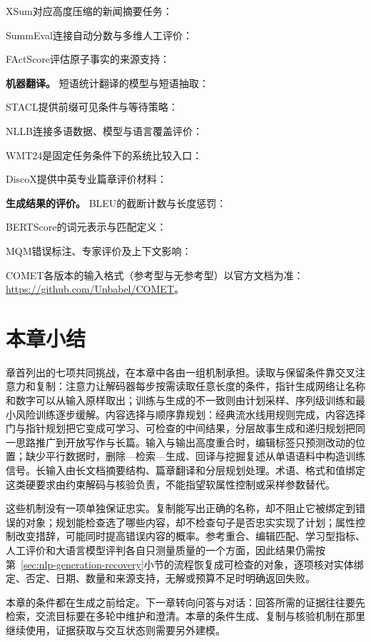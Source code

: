 \begin{fullwidth}
\par\smallskip
XSum对应高度压缩的新闻摘要任务：
\par\smallskip
SummEval连接自动分数与多维人工评价：
\par\smallskip
FActScore评估原子事实的来源支持：
\par\medskip
\textbf{机器翻译。}
短语统计翻译的模型与短语抽取：
\par\smallskip
STACL提供前缀可见条件与等待策略：
\par\smallskip
NLLB连接多语数据、模型与语言覆盖评价：
\par\smallskip
WMT24是固定任务条件下的系统比较入口：
\par\smallskip
DiscoX提供中英专业篇章评价材料：
\par\medskip
\textbf{生成结果的评价。}
BLEU的截断计数与长度惩罚：
\par\smallskip
BERTScore的词元表示与匹配定义：
\par\smallskip
MQM错误标注、专家评价及上下文影响：
\par\smallskip
COMET各版本的输入格式（参考型与无参考型）以官方文档为准：\url{https://github.com/Unbabel/COMET}。
\end{fullwidth}

\section{本章小结}
\label{sec:nlp-generation-summary}

章首列出的七项共同挑战，在本章中各由一组机制承担。读取与保留条件靠交叉注意力和复制：注意力让解码器每步按需读取任意长度的条件，指针生成网络让名称和数字可以从输入原样取出；训练与生成的不一致则由计划采样、序列级训练和最小风险训练逐步缓解。内容选择与顺序靠规划：经典流水线用规则完成，内容选择门与指针规划把它变成可学习、可检查的中间结果，分层故事生成和递归规划把同一思路推广到开放写作与长篇。输入与输出高度重合时，编辑标签只预测改动的位置；缺少平行数据时，删除—检索—生成、回译与挖掘复述从单语语料中构造训练信号。长输入由长文档摘要结构、篇章翻译和分层规划处理。术语、格式和值绑定这类硬要求由约束解码与核验负责，不能指望软属性控制或采样参数替代。

这些机制没有一项单独保证忠实。复制能写出正确的名称，却不阻止它被绑定到错误的对象；规划能检查选了哪些内容，却不检查句子是否忠实实现了计划；属性控制改变措辞，可能同时提高错误内容的概率。参考重合、编辑匹配、学习型指标、人工评价和大语言模型评判各自只测量质量的一个方面，因此结果仍需按第~\ref{sec:nlp-generation-recovery}小节的流程恢复成可检查的对象，逐项核对实体绑定、否定、日期、数量和来源支持，无解或预算不足时明确返回失败。

本章的条件都在生成之前给定。下一章转向问答与对话：回答所需的证据往往要先检索，交流目标要在多轮中维护和澄清。本章的条件生成、复制与核验机制在那里继续使用，证据获取与交互状态则需要另外建模。
